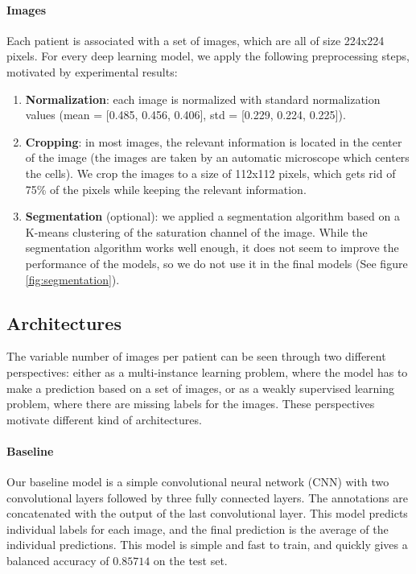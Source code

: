 \documentclass{midl}
\begin{document}
\paragraph*{Images}
Each patient is associated with a set of images, which are all of size 224x224 pixels. For every deep learning model, we apply the following preprocessing steps, motivated by experimental results:
\begin{enumerate}
    \setlength\itemsep{0em}
    \item \textbf{Normalization}: each image is normalized with standard normalization values (mean = [0.485, 0.456, 0.406], std = [0.229, 0.224, 0.225]).
    \item \textbf{Cropping}: in most images, the relevant information is located in the center of the image (the images are taken by an automatic microscope which centers the cells). We crop the images to a size of 112x112 pixels, which gets rid of 75\% of the pixels while keeping the relevant information.
    \item \textbf{Segmentation} (optional): we applied a segmentation algorithm based on a K-means clustering of the saturation channel of the image. While the segmentation algorithm works well enough, it does not seem to improve the performance of the models, so we do not use it in the final models (See figure \ref{fig:segmentation}).
\end{enumerate}

\subsection{Architectures}

The variable number of images per patient can be seen through two different perspectives: either as a multi-instance learning problem, where the model has to make a prediction based on a set of images, or as a weakly supervised learning problem, where there are missing labels for the images. These perspectives motivate different kind of architectures.

\paragraph*{Baseline}

Our baseline model is a simple convolutional neural network (CNN) with two convolutional layers followed by three fully connected layers. The annotations are concatenated with the output of the last convolutional layer. This model predicts individual labels for each image, and the final prediction is the average of the individual predictions. This model is simple and fast to train, and quickly gives a balanced accuracy of $0.85714$ on the test set.
\end{document}
